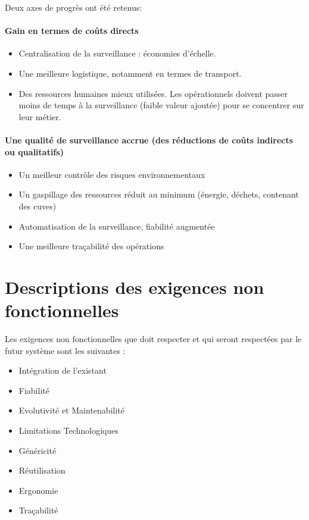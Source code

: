 \documentclass[a4paper]{article}
\begin{document}
Deux axes de progrès ont été retenus:

\paragraph{Gain en termes de coûts directs}

\begin{itemize}
\item Centralisation de la surveillance : économies d'échelle.
\item Une meilleure logistique, notamment en termes de transport.
\item Des ressources humaines mieux utilisées. Les opérationnels doivent passer moins de temps à la surveillance (faible valeur ajoutée) pour se concentrer sur leur métier.
\end{itemize}

\paragraph{Une qualité de surveillance accrue (des réductions de coûts indirects ou qualitatifs)}

\begin{itemize}
\item Un meilleur contrôle des risques environnementaux
\item Un gaspillage des ressources réduit au minimum (énergie, déchets, contenant des cuves)
\item Automatisation de la surveillance, fiabilité augmentée
\item Une meilleure traçabilité des opérations
\end{itemize}

\section{Descriptions des exigences non fonctionnelles}

Les exigences non fonctionnelles que doit respecter et qui seront respectées par le futur système sont les suivantes :

\begin{itemize}
\item Intégration de l'existant
\item Fiabilité
\item Evolutivité et Maintenabilité
\item Limitations Technologiques
\item Généricité
\item Réutilisation
\item Ergonomie
\item Traçabilité
\end{itemize}
\end{document}

